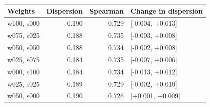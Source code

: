 \begin{tabular}{@{}lrrl@{}}\toprule
Weights & Dispersion & Spearman & Change in dispersion \\\midrule
w100, s000 & 0.190 & 0.729 & [-0.004, +0.013] \\
w075, s025 & 0.188 & 0.735 & [-0.003, +0.008] \\
w050, s050 & 0.188 & 0.734 & [-0.002, +0.008] \\
w025, s075 & 0.184 & 0.735 & [-0.007, +0.006] \\
w000, s100 & 0.184 & 0.734 & [-0.013, +0.012] \\
w025, s025 & 0.189 & 0.729 & [-0.002, +0.010] \\
w050, s000 & 0.190 & 0.726 & [+0.001, +0.009] \\
\bottomrule\end{tabular}
